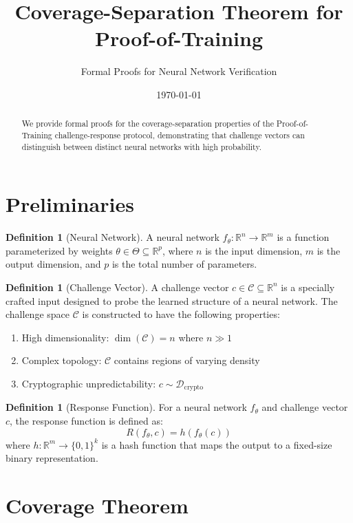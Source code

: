 \documentclass[11pt]{article}
\title{Coverage-Separation Theorem for Proof-of-Training}
\author{Formal Proofs for Neural Network Verification}
\date{\today}
\theoremstyle{plain}
\theoremstyle{definition}
\newtheorem{definition}[theorem]{Definition}
\theoremstyle{remark}
\begin{document}
\maketitle

\begin{abstract}
We provide formal proofs for the coverage-separation properties of the 
Proof-of-Training challenge-response protocol, demonstrating that challenge 
vectors can distinguish between distinct neural networks with high probability.
\end{abstract}

\section{Preliminaries}

\begin{definition}[Neural Network]
A neural network $f_\theta: \mathbb{R}^n \rightarrow \mathbb{R}^m$ is a 
function parameterized by weights $\theta \in \Theta \subseteq \mathbb{R}^p$, 
where $n$ is the input dimension, $m$ is the output dimension, and $p$ is 
the total number of parameters.
\end{definition}

\begin{definition}[Challenge Vector]
A challenge vector $c \in \mathcal{C} \subseteq \mathbb{R}^n$ is a specially 
crafted input designed to probe the learned structure of a neural network.
The challenge space $\mathcal{C}$ is constructed to have the following properties:
\begin{enumerate}
    \item High dimensionality: $\dim(\mathcal{C}) = n$ where $n \gg 1$
    \item Complex topology: $\mathcal{C}$ contains regions of varying density
    \item Cryptographic unpredictability: $c \sim \mathcal{D}_{\text{crypto}}$
\end{enumerate}
\end{definition}

\begin{definition}[Response Function]
For a neural network $f_\theta$ and challenge vector $c$, the response function 
is defined as:
$$R(f_\theta, c) = h(f_\theta(c))$$
where $h: \mathbb{R}^m \rightarrow \{0,1\}^k$ is a hash function that maps 
the output to a fixed-size binary representation.
\end{definition}

\section{Coverage Theorem}
\end{document}
